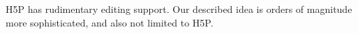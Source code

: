 H5P has rudimentary editing support\cite{h5pcontent}. Our described idea is 
orders of magnitude more sophisticated, and also not limited to H5P.
